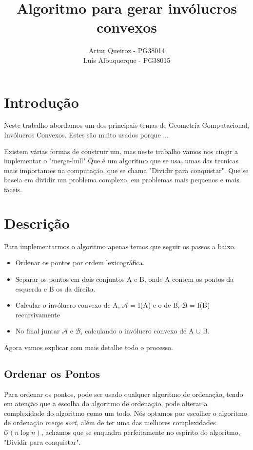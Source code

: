 \documentclass[11pt]{article}
\title{Algoritmo para gerar invólucros convexos}
\author{Artur Queiroz - PG38014\\Luís Albuquerque - PG38015}
\begin{document}
\maketitle

\section{Introdução}
Neste trabalho abordamos um dos principais temas de Geometria 
Computacional, Invólucros Convexos.
Estes são muito usados porque ...

Existem várias formas de construir um, mas neste trabalho vamos
nos cingir a implementar o "merge-hull"
Que é um algoritmo que se usa, umas das tecnicas mais importantes
na computação, que se chama "Dividir para conquistar".
Que se baseia em dividir um problema complexo, em problemas mais 
pequenos e mais faceis.

\section{Descrição}
Para implementarmos o algoritmo apenas temos que seguir os passos
a baixo.

\begin{itemize}
    \item Ordenar os pontos por ordem lexicográfica.
    \item Separar os pontos em dois conjuntos A e B, onde A contem os pontos da esquerda e B os da direita.
    \item Calcular o invólucro convexo de A, $\mathcal{A}$ = I(A) e o de B, $\mathcal{B}$ = I(B) recursivamente
    \item No final juntar $\mathcal{A}$ e $\mathcal{B}$, calculando o invólucro convexo de A $\cup$ B.
\end{itemize}

Agora vamos explicar com mais detalhe todo o processo.
\subsection{ Ordenar os Pontos }
Para ordenar os pontos, pode ser usado qualquer algoritmo de ordenação,
tendo em atenção que a escolha do algoritmo de ordenação, pode alterar a
complexidade do algoritmo como um todo.
Nós optamos por escolher o algoritmo de ordenação \textit{merge sort},
além de ter uma das melhores complexidades $\mathcal{O}(n\log{}n)$, achamos 
que se enquadra perfeitamente no espirito do algoritmo, "Dividir para conquistar".
\end{document}
